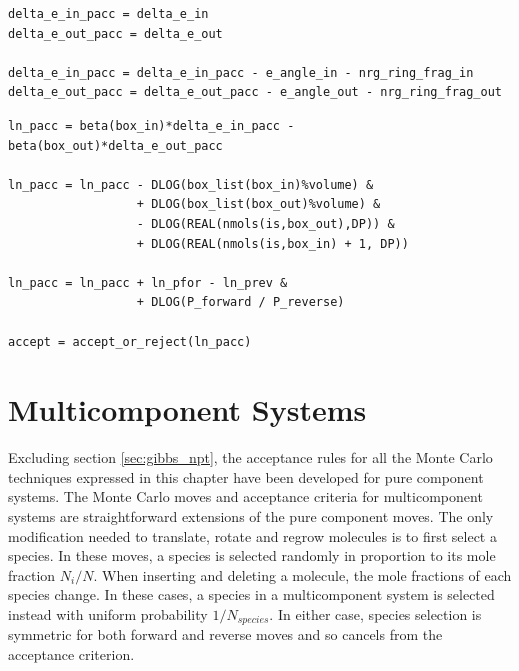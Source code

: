 \begin{minipage}{\linewidth}
\begin{lstlisting}[firstnumber=587, caption=move\_mol\_swap.f90]
delta_e_in_pacc = delta_e_in
delta_e_out_pacc = delta_e_out

delta_e_in_pacc = delta_e_in_pacc - e_angle_in - nrg_ring_frag_in
delta_e_out_pacc = delta_e_out_pacc - e_angle_out - nrg_ring_frag_out
\end{lstlisting}

\begin{lstlisting}[firstnumber=598]
ln_pacc = beta(box_in)*delta_e_in_pacc - beta(box_out)*delta_e_out_pacc

ln_pacc = ln_pacc - DLOG(box_list(box_in)%volume) &
                  + DLOG(box_list(box_out)%volume) &
                  - DLOG(REAL(nmols(is,box_out),DP)) &
                  + DLOG(REAL(nmols(is,box_in) + 1, DP))

ln_pacc = ln_pacc + ln_pfor - ln_prev &
                  + DLOG(P_forward / P_reverse)

accept = accept_or_reject(ln_pacc)
\end{lstlisting}
\end{minipage}


\section{Multicomponent Systems} 

Excluding section \ref{sec:gibbs_npt}, the acceptance rules for all the Monte Carlo techniques expressed in this chapter
have been developed for pure component systems. 
The Monte Carlo moves and acceptance criteria for multicomponent systems are straightforward extensions of the pure component moves. 
The only modification needed to translate, rotate and regrow molecules is to first select a species. 
In these moves, a species is selected randomly in proportion to its mole fraction $N_i/N$. 
When inserting and deleting a molecule, the mole fractions of each species change. 
In these cases, a species in a multicomponent system is selected instead with uniform probability $1/N_{species}$. 
In either case, species selection is symmetric for both forward and reverse moves and so cancels from the acceptance criterion.

